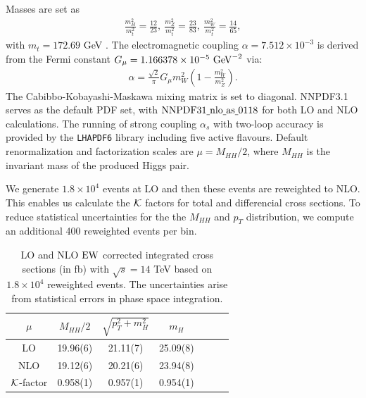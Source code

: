 Masses are set as
\begin{eqnarray}
\frac{m_H^2}{m_t^2}=\frac{12}{23},~\frac{m_Z^2}{m_t^2}=\frac{23}{83},~\frac{m_W^2}{m_t^2}=\frac{14}{65},
\end{eqnarray}
with $m_t=172.69$  GeV \cite{ParticleDataGroup:2022pth}. The electromagnetic coupling $\alpha=7.512\times 10^{-3}$ is derived from the Fermi constant $G_{\mu}=1.166378\times 10^{-5}~{\rm GeV}^{-2}$ via:
\begin{eqnarray}
\alpha=\frac{\sqrt{2}}{\pi}G_{\mu}m_W^2 \left(1-\frac{m_W^2}{m_Z^2}\right).
 \end{eqnarray}
The Cabibbo-Kobayashi-Maskawa mixing matrix is set to diagonal. NNPDF3.1\cite{NNPDF:2017mvq} serves as the default PDF set, with $\rm NNPDF31\underline{~}nlo\underline{~}as\underline{~}0118$ for both LO and NLO calculations. The running of strong coupling $\alpha_s$ with two-loop accuracy is provided by the {\tt LHAPDF6} library \cite{Buckley:2014ana} including five active flavours. Default renormalization and factorization scales are $\mu=M_{HH}/2$, where $M_{HH}$ is the invariant mass of the produced Higgs pair. 

We generate $1.8\times 10^4$ events at LO and then these events are reweighted to NLO. This enables us calculate the $\cal{K}$ factors for total and differencial cross sections. To  reduce statistical uncertainties for the the $M_{HH}$ and $p_T$ distribution, we compute an additional 400 reweighted events per bin.

\begin{table}[htbp]
\begin{center}
\renewcommand\arraystretch{1.8}
\begin{tabular}{ccccccc}
\hline
\hline
$\mu$  & $M_{HH}/2$  & $\sqrt{p_{T}^2+m_H^2}$ & $m_H$ \\
\hline
LO   & 19.96(6)   & 21.11(7)  & 25.09(8) \\
NLO  & 19.12(6)   & 20.21(6)  & 23.94(8) \\
${\cal K}$-factor  & 0.958(1)   &     0.957(1)   &   0.954(1)     \\
\hline
\hline
\end{tabular}
\caption{LO and NLO ${\rm EW}$ corrected integrated cross sections (in fb) with $\sqrt{s}= 14$ TeV based on $1.8\times 10^4$ reweighted events. The uncertainties arise from statistical errors in phase space integration.}
\label{total-cs}
\end{center}
\end{table}

